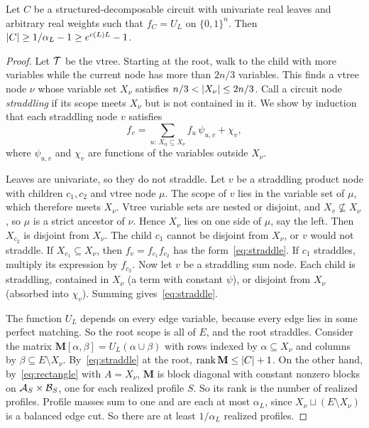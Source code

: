 \begin{proposition}\label{prop:structured-signed}
Let $C$ be a structured-decomposable circuit with univariate real leaves and arbitrary real weights such that $f_C=U_L$ on $\{0,1\}^n$. Then $\lvert C\rvert\ge1/\alpha_L-1\ge e^{c(L)L}-1$.
\end{proposition}

\begin{proof}
Let $\mathcal{T}$ be the vtree. Starting at the root, walk to the child with more variables while the current node has more than $2n/3$ variables. This finds a vtree node $\nu$ whose variable set $X_\nu$ satisfies $n/3<\lvert X_\nu\rvert\le2n/3$. Call a circuit node \emph{straddling} if its scope meets $X_\nu$ but is not contained in it. We show by induction that each straddling node $v$ satisfies
\begin{equation}\label{eq:straddle}
  f_v=\sum_{u:\,X_u\subseteq X_\nu}f_u\,\psi_{u,v}+\chi_v ,
\end{equation}
where $\psi_{u,v}$ and $\chi_v$ are functions of the variables outside $X_\nu$.

Leaves are univariate, so they do not straddle. Let $v$ be a straddling product node with children $c_1,c_2$ and vtree node $\mu$. The scope of $v$ lies in the variable set of $\mu$, which therefore meets $X_\nu$. Vtree variable sets are nested or disjoint, and $X_v\not\subseteq X_\nu$, so $\mu$ is a strict ancestor of $\nu$. Hence $X_\nu$ lies on one side of $\mu$, say the left. Then $X_{c_2}$ is disjoint from $X_\nu$. The child $c_1$ cannot be disjoint from $X_\nu$, or $v$ would not straddle. If $X_{c_1}\subseteq X_\nu$, then $f_v=f_{c_1}f_{c_2}$ has the form~\eqref{eq:straddle}. If $c_1$ straddles, multiply its expression by $f_{c_2}$. Now let $v$ be a straddling sum node. Each child is straddling, contained in $X_\nu$ (a term with constant $\psi$), or disjoint from $X_\nu$ (absorbed into $\chi_v$). Summing gives~\eqref{eq:straddle}.

The function $U_L$ depends on every edge variable, because every edge lies in some perfect matching. So the root scope is all of $E$, and the root straddles. Consider the matrix $\mathbf M[\alpha,\beta]=U_L(\alpha\cup\beta)$ with rows indexed by $\alpha\subseteq X_\nu$ and columns by $\beta\subseteq E\setminus X_\nu$. By~\eqref{eq:straddle} at the root, $\operatorname{rank}\mathbf M\le\lvert C\rvert+1$. On the other hand, by~\eqref{eq:rectangle} with $A=X_\nu$, $\mathbf M$ is block diagonal with constant nonzero blocks on $\mathcal{A}_S\times\mathcal{B}_S$, one for each realized profile $S$. So its rank is the number of realized profiles. Profile masses sum to one and are each at most $\alpha_L$, since $X_\nu\sqcup(E\setminus X_\nu)$ is a balanced edge cut. So there are at least $1/\alpha_L$ realized profiles.
\end{proof}

